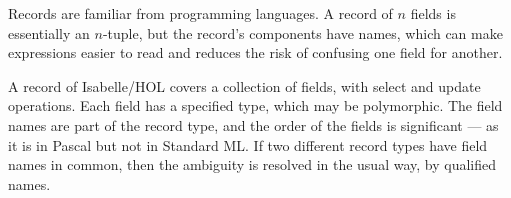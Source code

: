 %
\begin{isabellebody}%
\def\isabellecontext{Records}%
%
\isamarkuptrue%
%
\isadelimtheory
%
\endisadelimtheory
%
\isatagtheory
%
\endisatagtheory
{\isafoldtheory}%
%
\isadelimtheory
%
\endisadelimtheory
%
\begin{isamarkuptext}%
%
  Records are familiar from programming languages.  A record of $n$
  fields is essentially an $n$-tuple, but the record's components have
  names, which can make expressions easier to read and reduces the
  risk of confusing one field for another.

  A record of Isabelle/HOL covers a collection of fields, with select
  and update operations.  Each field has a specified type, which may
  be polymorphic.  The field names are part of the record type, and
  the order of the fields is significant --- as it is in Pascal but
  not in Standard ML.  If two different record types have field names
  in common, then the ambiguity is resolved in the usual way, by
  qualified names.


\end{isamarkuptext}
\end{isabellebody}
